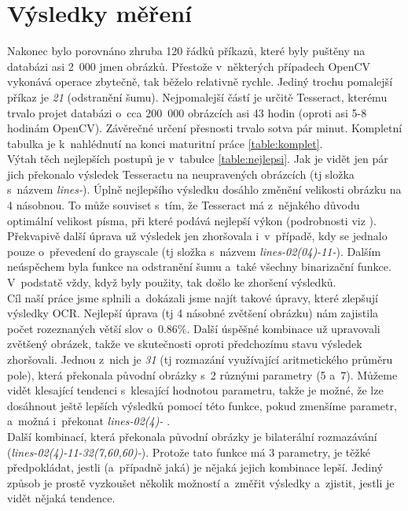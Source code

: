 \documentclass[12pt,oneside]{report}			%
\begin{document}
\chapter{Výsledky měření}
	Nakonec bylo porovnáno zhruba 120 řádků příkazů, které byly puštěny na databázi asi 2~000 jmen obrázků. Přestože v~některých případech OpenCV vykonává operace zbytečně, tak běželo relativně rychle. Jediný trochu pomalejší příkaz je \emph{21} (odstranění šumu). Nejpomalejší částí je určitě Tesseract, kterému trvalo projet databázi o~cca 200~000 obrázcích asi 43 hodin (oproti asi 5-8 hodinám OpenCV). Závěrečné určení přesnosti trvalo sotva pár minut. Kompletní tabulka je k~nahlédnutí na konci maturitní práce \ref{table:komplet}.\\ 
	Výtah těch nejlepších postupů je v~tabulce \ref{table:nejlepsi}. Jak je vidět jen pár jich překonalo výsledek Tesseractu na neupravených obrázcích (\gls{tj} složka s~názvem \emph{lines-}). Úplně nejlepšího výsledku dosáhlo změnění velikosti obrázku na 4 násobnou. To může souviset s~tím, že Tesseract má z~nějakého důvodu optimální velikost písma, při které podává nejlepší výkon (podrobnosti  \gls{viz} \parencite{tess_weird}). Překvapivě další úprava už výsledek jen zhoršovala i~v~případě, kdy se jednalo pouze o~převedení do grayscale (\gls{tj} složka s~názvem \emph{lines-02(04)-11-}). Dalším neúspěchem byla funkce na odstranění šumu a~také všechny binarizační funkce. V~podstatě vždy, když byly použity, tak došlo ke zhoršení výsledků.\\ 
	Cíl naší práce jsme splnili a~dokázali jsme najít takové úpravy, které zlepšují výsledky \gls{OCR}. Nejlepší úprava (\gls{tj} 4 násobné zvětšení obrázku) nám zajistila počet rozeznaných větší slov o~$0.86\%$. Další úspěšné kombinace už upravovali zvětšený obrázek, takže ve skutečnosti oproti předchozímu stavu výsledek zhoršovali. Jednou z~nich je \emph{31} (\gls{tj} rozmazání využívající aritmetického průměru pole), která překonala původní obrázky s~2 různými parametry (5 a~7). Můžeme vidět klesající tendenci s~klesající hodnotou parametru, takže je možné, že lze dosáhnout ještě lepších výsledků pomocí této funkce, pokud zmenšíme parametr, a~možná i~překonat \emph{lines-02(4)- }.\\
	Další kombinací, která překonala původní obrázky je bilaterální rozmazávání (\emph{lines-02(4)-11-32(7,60,60)-}). Protože tato funkce má 3 parametry, je těžké předpokládat, jestli (a~případně jaká) je nějaká jejich kombinace lepší. Jediný způsob je prostě vyzkoušet několik možností a~změřit výsledky a~zjistit, jestli je vidět nějaká tendence.\\
\end{document}
